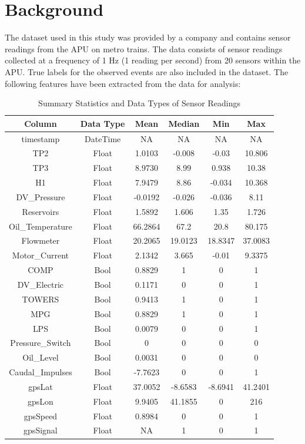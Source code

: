 \documentclass{article}
\begin{document}
\section{Background}

The dataset used in this study was provided by a company and contains sensor readings from the APU on metro trains. The data consists of sensor readings collected at a frequency of 1 Hz (1 reading per second) from 20 sensors within the APU. True labels for the observed events are also included in the dataset. The following features have been extracted from the data for analysis:

\begin{table}[htbp]
\centering
\caption{Summary Statistics and Data Types of Sensor Readings}
\begin{tabular}{|c|c|c|c|c|c|}
\hline
Column & Data Type & Mean & Median & Min & Max \\
\hline
timestamp & DateTime & NA & NA & NA & NA \\
TP2 & Float & 1.0103 & -0.008 & -0.03 & 10.806 \\
TP3 & Float & 8.9730 & 8.99 & 0.938 & 10.38 \\
H1 & Float & 7.9479 & 8.86 & -0.034 & 10.368 \\
DV\_Pressure & Float & -0.0192 & -0.026 & -0.036 & 8.11 \\
Reservoirs & Float & 1.5892 & 1.606 & 1.35 & 1.726 \\
Oil\_Temperature & Float & 66.2864 & 67.2 & 20.8 & 80.175 \\
Flowmeter & Float & 20.2065 & 19.0123 & 18.8347 & 37.0083 \\
Motor\_Current & Float & 2.1342 & 3.665 & -0.01 & 9.3375 \\
COMP & Bool & 0.8829 & 1 & 0 & 1 \\
DV\_Electric & Bool & 0.1171 & 0 & 0 & 1 \\
TOWERS & Bool & 0.9413 & 1 & 0 & 1 \\
MPG & Bool & 0.8829 & 1 & 0 & 1 \\
LPS & Bool & 0.0079 & 0 & 0 & 1 \\
Pressure\_Switch & Bool & 0 & 0 & 0 & 0 \\
Oil\_Level & Bool & 0.0031 & 0 & 0 & 0 \\
Caudal\_Impulses & Bool & -7.7623 & 0 & 0 & 1 \\
gpsLat & Float & 37.0052 & -8.6583 & -8.6941 & 41.2401 \\
gpsLon & Float & 9.9405 & 41.1855 & 0 & 216 \\
gpsSpeed & Float & 0.8984 & 0 & 0 & 1 \\
gpsSignal & Float & NA & 1 & 0 & 1 \\
\hline
\end{tabular}
\end{table}
\end{document}
